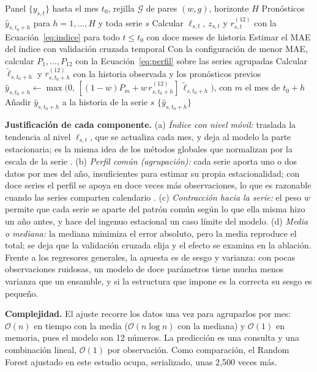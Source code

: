 \documentclass[pdflatex,sn-mathphys-num]{sn-jnl}
\begin{document}
\begin{algorithm}
\caption{Perfil estacional global contraído y proyección recursiva}\label{alg:propuesto}
\begin{algorithmic}[1]
\Require Panel $\{y_{s,t}\}$ hasta el mes $t_0$, rejilla $\mathcal{G}$ de pares $(w,g)$, horizonte $H$
\Ensure Pronósticos $\hat{y}_{s,t_0+h}$ para $h=1,\dots,H$ y toda serie $s$
\State Calcular $\ell_{s,t}$, $z_{s,t}$ y $r^{(12)}_{s,t}$ con la Ecuación~\eqref{eq:indice} para todo $t\le t_0$ con doce meses de historia
    \State Estimar el MAE del índice con validación cruzada temporal
\EndFor
\State Con la configuración de menor MAE, calcular $P_1,\dots,P_{12}$ con la Ecuación~\eqref{eq:perfil} sobre las series agrupadas
    \State Calcular $\tilde{\ell}_{s,t_0+h}$ y $r^{(12)}_{s,t_0+h}$ con la historia observada y los pronósticos previos
    \State $\hat{y}_{s,t_0+h}\gets\max\bigl(0,\,[(1-w)P_{m}+w\,r^{(12)}_{s,t_0+h}]\,\tilde{\ell}_{s,t_0+h}\bigr)$, con $m$ el mes de $t_0+h$
    \State Añadir $\hat{y}_{s,t_0+h}$ a la historia de la serie $s$
\EndFor
\State \Return $\{\hat{y}_{s,t_0+h}\}$
\end{algorithmic}
\end{algorithm}

\textbf{Justificación de cada componente.} (a) \emph{Índice con nivel móvil:} traslada la tendencia al nivel $\ell_{s,t}$, que se actualiza cada mes, y deja al modelo la parte estacionaria; es la misma idea de los métodos globales que normalizan por la escala de la serie \cite{salinas2020,smyl2020}. (b) \emph{Perfil común (agrupación):} cada serie aporta uno o dos datos por mes del año, insuficientes para estimar su propia estacionalidad; con doce series el perfil se apoya en doce veces más observaciones, lo que es razonable cuando las series comparten calendario \cite{monteromanso2021}. (c) \emph{Contracción hacia la serie:} el peso $w$ permite que cada serie se aparte del patrón común según lo que ella misma hizo un año antes, y hace del ingenuo estacional un caso límite del modelo. (d) \emph{Media o mediana:} la mediana minimiza el error absoluto, pero la media reproduce el total; se deja que la validación cruzada elija y el efecto se examina en la ablación. Frente a los regresores generales, la apuesta es de sesgo y varianza: con pocas observaciones ruidosas, un modelo de doce parámetros tiene mucha menos varianza que un ensamble, y si la estructura que impone es la correcta su sesgo es pequeño.

\textbf{Complejidad.} El ajuste recorre los datos una vez para agruparlos por mes: $\mathcal{O}(n)$ en tiempo con la media ($\mathcal{O}(n\log n)$ con la mediana) y $\mathcal{O}(1)$ en memoria, pues el modelo son 12 números. La predicción es una consulta y una combinación lineal, $\mathcal{O}(1)$ por observación. Como comparación, el Random Forest ajustado en este estudio ocupa, serializado, unas 2{,}500 veces más.
\end{document}
